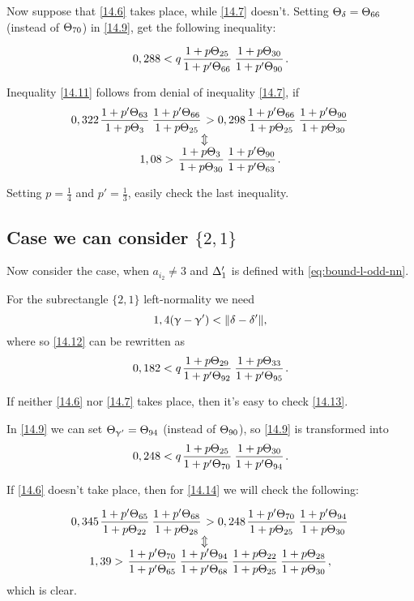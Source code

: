 Now suppose that \ref{14.6} takes place, while \ref{14.7} doesn't.
Setting $\Theta_{\delta} = \Theta_{66}$ (instead of $\Theta_{70}$) in \ref{14.9}, get the following inequality:

\begin{equation}\label{14.11}
	0,288 < q \up{25}{66} \up{30}{90}.
\end{equation}

Inequality \ref{14.11} follows from denial of inequality \ref{14.7}, if
\begin{gather*}
	0,322 \pu{63}{3} \pu{66}{25} > 0,298 \pu{66}{25} \pu{90}{30}\\
	\ArrowBetweenLines
	1,08 > \uu{3}{30} \pp{90}{63}.
\end{gather*}

Setting $p = \frac{1}{4}$ and $p' = \frac{1}{3}$, easily check the last inequality.

\subsection{Case we can consider $\{2, 1\}$}

Now consider the case, when $a_{i_2} \ne 3$ and $\Delta_1'$ is defined with \ref{eq:bound-l-odd-nn}.

For the subrectangle $\{2, 1\}$ left-normality we need
\begin{equation}\label{14.12}
	1,4 (\upgamma - \upgamma') < \| \delta - \delta' \|,
\end{equation}
where
so \ref{14.12} can be rewritten as
\begin{equation}\label{14.13}
	0,182 < q \up{29}{92} \up{33}{95}.
\end{equation}

If neither \ref{14.6} nor \ref{14.7} takes place, then it's easy to check \ref{14.13}.

In \ref{14.9} we can set $\Theta_{\upgamma'} = \Theta_{94}$ (instead of $\Theta_{90}$), so \ref{14.9} is transformed into
\begin{equation}\label{14.14}
	0,248 < q \up{25}{70} \up{30}{94}.
\end{equation}

If \ref{14.6} doesn't take place, then for \ref{14.14} we will check the following:

\begin{gather*}
	0,345 \pu{65}{22} \pu{68}{28} > 0,248 \pu{70}{25} \pu{94}{30}\\
	\ArrowBetweenLines
	1,39 > \pp{70}{65} \pp{94}{68} \uu{22}{25} \uu{28}{30},
\end{gather*}
which is clear.

